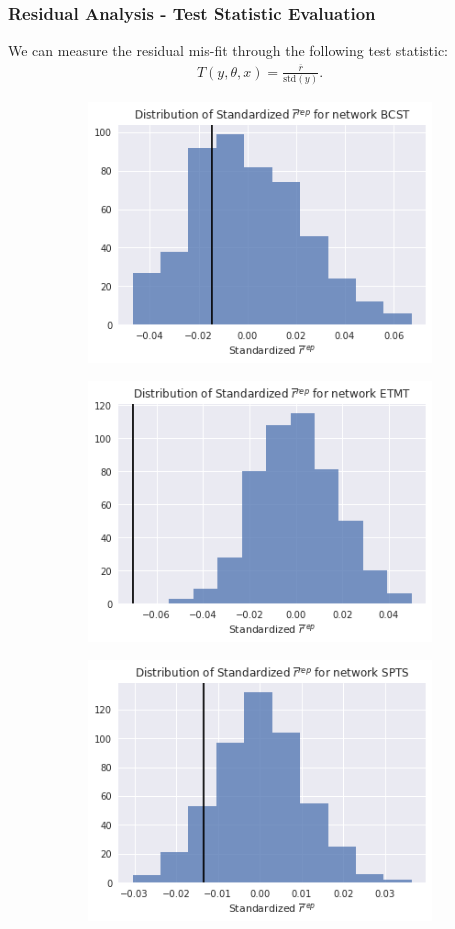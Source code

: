 \documentclass{beamer}
\begin{document}
\begin{frame}
\frametitle{Residual Analysis - Test Statistic Evaluation}
    We can measure the residual mis-fit through the following test statistic:
    \begin{align*}
      T(y, \theta, x) = \frac{\overline{r}}{\text{std}(y)}.
    \end{align*}
    \pause
    \begin{figure}[!h]
      \begin{subfigure}[b]{.32\textwidth}
        \centering
        \includegraphics[scale=0.3]{BCST_res_test}
      \end{subfigure}
      \begin{subfigure}[b]{.32\textwidth}
        \centering
        \includegraphics[scale=0.3]{ETMT_res_test}
      \end{subfigure}
      \begin{subfigure}[b]{.32\textwidth}
        \centering
        \includegraphics[scale=0.3]{SPTS_res_test}
      \end{subfigure}
    \end{figure}
\end{frame}
\end{document}

